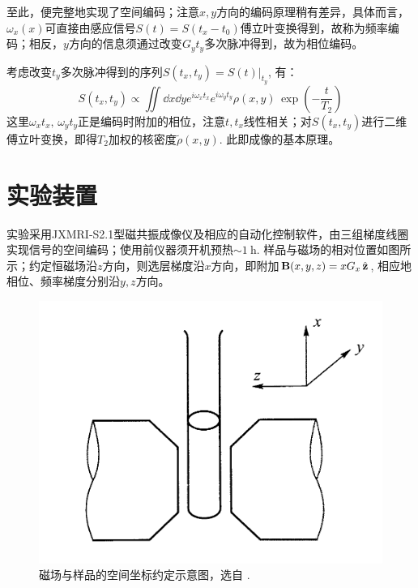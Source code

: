 \documentclass[aps,pre,12pt,preprint,%
	onecolumn,showpacs,showkeys,nofootinbib]{revtex4-1}
\begin{document}
	至此，便完整地实现了空间编码；注意$x,y$方向的编码原理稍有差异，具体而言，$\omega_x(x)$可直接由感应信号$S(t) = S(t_x - t_0)$傅立叶变换得到，故称为频率编码；相反，$y$方向的信息须通过改变$G_y t_y$多次脉冲得到，故为相位编码。
\clearpage
	
	考虑改变$t_y$多次脉冲得到的序列$S(t_x,t_y) = S(t)|_{t_y}$, 有：
	\begin{equation}
		S(t_x, t_y) \propto \iint\dd{x}\dd{y}
			e^{i\omega_x t_x} e^{i\omega_y t_y}
			\rho(x,y)\,
			\exp(-\frac{t}{T_2})
	\end{equation}
	这里$\omega_x t_x,\,\omega_y t_y$正是编码时附加的相位，注意$t, t_x$线性相关；对$S(t_x, t_y)$进行二维傅立叶变换，即得$T_2$加权的核密度$\tilde{\rho}(x,y)$. 此即成像的基本原理。
\section{实验装置}
\vspace{0\baselineskip}
	实验采用JXMRI-S2.1型磁共振成像仪及相应的自动化控制软件，由三组梯度线圈实现信号的空间编码；使用前仪器须开机预热$\sim\SI{1}{\hour}$. 样品与磁场的相对位置如图所示；约定恒磁场沿$z$方向，则选层梯度沿$x$方向，即附加$\vb{B}(x,y,z) = xG_x\,\hat{\vb{z}}$, 相应地相位、频率梯度分别沿$y,z$方向。
	\begin{figure}[!ht]
	\centering
	\includegraphics[width=.5\linewidth]{img/scheme.png}
	\caption{磁场与样品的空间坐标约定示意图，选自 \cite{textbook}. }
	\end{figure}
	
\end{document}
